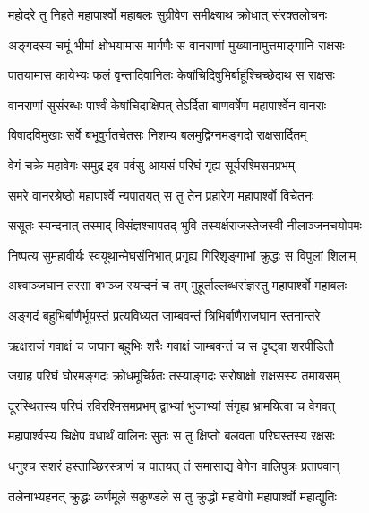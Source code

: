 
\twolineshloka
{महोदरे तु निहते महापार्श्वो महाबलः}
{सुग्रीवेण समीक्ष्याथ क्रोधात् संरक्तलोचनः} %

\twolineshloka
{अङ्गदस्य चमूं भीमां क्षोभयामास मार्गणैः}
{स वानराणां मुख्यानामुत्तमाङ्गानि राक्षसः} %

\twolineshloka
{पातयामास कायेभ्यः फलं वृन्तादिवानिलः}
{केषांचिदिषुभिर्बाहूंश्चिच्छेदाथ स राक्षसः} %

\twolineshloka
{वानराणां सुसंरब्धः पार्श्वं केषांचिदाक्षिपत्}
{तेऽर्दिता बाणवर्षेण महापार्श्वेन वानराः} %

\twolineshloka
{विषादविमुखाः सर्वे बभूवुर्गतचेतसः}
{निशम्य बलमुद्विग्नमङ्गदो राक्षसार्दितम्} %

\twolineshloka
{वेगं चक्रे महावेगः समुद्र इव पर्वसु}
{आयसं परिघं गृह्य सूर्यरश्मिसमप्रभम्} %

\twolineshloka
{समरे वानरश्रेष्ठो महापार्श्वे न्यपातयत्}
{स तु तेन प्रहारेण महापार्श्वो विचेतनः} %

\twolineshloka
{ससूतः स्यन्दनात् तस्माद् विसंज्ञश्चापतद् भुवि}
{तस्यर्क्षराजस्तेजस्वी नीलाञ्जनचयोपमः} %

\twolineshloka
{निष्पत्य सुमहावीर्यः स्वयूथान्मेघसंनिभात्}
{प्रगृह्य गिरिशृङ्गाभां क्रुद्धः स विपुलां शिलाम्} %

\twolineshloka
{अश्वाञ्जघान तरसा बभञ्ज स्यन्दनं च तम्}
{मुहूर्ताल्लब्धसंज्ञस्तु महापार्श्वो महाबलः} %

\twolineshloka
{अङ्गदं बहुभिर्बाणैर्भूयस्तं प्रत्यविध्यत}
{जाम्बवन्तं त्रिभिर्बाणैराजघान स्तनान्तरे} %

\twolineshloka
{ऋक्षराजं गवाक्षं च जघान बहुभिः शरैः}
{गवाक्षं जाम्बवन्तं च स दृष्ट्वा शरपीडितौ} %

\twolineshloka
{जग्राह परिघं घोरमङ्गदः क्रोधमूर्च्छितः}
{तस्याङ्गदः सरोषाक्षो राक्षसस्य तमायसम्} %

\twolineshloka
{दूरस्थितस्य परिघं रविरश्मिसमप्रभम्}
{द्वाभ्यां भुजाभ्यां संगृह्य भ्रामयित्वा च वेगवत्} %

\twolineshloka
{महापार्श्वस्य चिक्षेप वधार्थं वालिनः सुतः}
{स तु क्षिप्तो बलवता परिघस्तस्य रक्षसः} %

\twolineshloka
{धनुश्च सशरं हस्ताच्छिरस्त्राणं च पातयत्}
{तं समासाद्य वेगेन वालिपुत्रः प्रतापवान्} %

\twolineshloka
{तलेनाभ्यहनत् क्रुद्धः कर्णमूले सकुण्डले}
{स तु क्रुद्धो महावेगो महापार्श्वो महाद्युतिः} %

